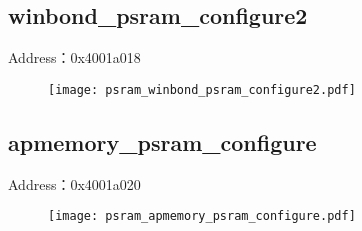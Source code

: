 \subsection{winbond\_psram\_configure2}
\label{psram-winbond-psram-configure2}
Address：0x4001a018
 \begin{figure}[H]
\texttt{[image: psram\_winbond\_psram\_configure2.pdf]}
\end{figure}

\subsection{apmemory\_psram\_configure}
\label{psram-apmemory-psram-configure}
Address：0x4001a020
 \begin{figure}[H]
\texttt{[image: psram\_apmemory\_psram\_configure.pdf]}
\end{figure}

